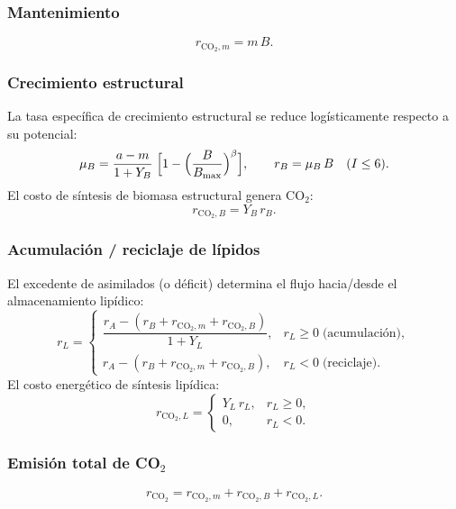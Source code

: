 \subsubsection{Mantenimiento}
\begin{equation}
    r_{\mathrm{CO_2},m} = m\,B.
\end{equation}

\subsubsection{Crecimiento estructural}
La tasa espec\'{i}fica de crecimiento estructural se reduce log\'{i}sticamente respecto a su potencial:
\begin{equation}
    \mu_B = \frac{a - m}{1 + Y_B}\;\Bigl[1 - \Bigl(\frac{B}{B_{\max}}\Bigr)^{\beta}\Bigr],
    \qquad
    r_B = \mu_B\,B \quad (I \le 6).
\end{equation}
El costo de s\'{i}ntesis de biomasa estructural genera CO$_2$:
\begin{equation}
    r_{\mathrm{CO_2},B} = Y_B\,r_B.
\end{equation}

\subsubsection{Acumulaci\'{o}n / reciclaje de l\'{i}pidos}
El excedente de asimilados (o d\'{e}ficit) determina el flujo hacia/desde el almacenamiento lip\'{i}dico:
\begin{equation}
    r_L =
    \begin{cases}
        \dfrac{r_A - (r_B + r_{\mathrm{CO_2},m} + r_{\mathrm{CO_2},B})}{1 + Y_L}, & r_L \ge 0 \;\text{(acumulaci\'{o}n)}, \\[10pt]
        r_A - (r_B + r_{\mathrm{CO_2},m} + r_{\mathrm{CO_2},B}), & r_L < 0 \;\text{(reciclaje)}.
    \end{cases}
\end{equation}
El costo energ\'{e}tico de s\'{i}ntesis lip\'{i}dica:
\begin{equation}
    r_{\mathrm{CO_2},L} =
    \begin{cases}
        Y_L\,r_L, & r_L \ge 0, \\[4pt]
        0, & r_L < 0.
    \end{cases}
\end{equation}

\subsubsection{Emisi\'{o}n total de CO$_2$}
\begin{equation}
    r_{\mathrm{CO_2}} = r_{\mathrm{CO_2},m} + r_{\mathrm{CO_2},B} + r_{\mathrm{CO_2},L}.
\end{equation}

